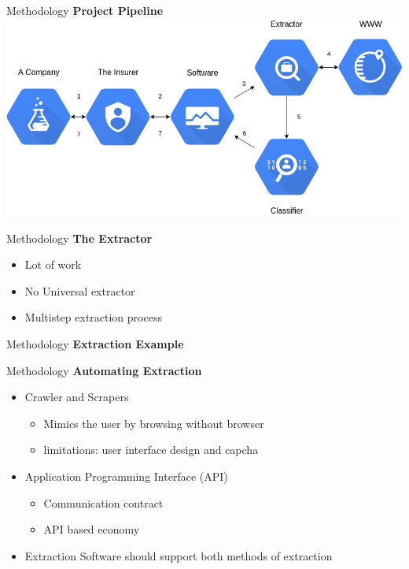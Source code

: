 \begin{frame}[label=metho]{Methodology}
	\textbf{Project Pipeline}
	\includegraphics[width=\textwidth]{images/project_pipeline.png}
\end{frame}


\begin{frame}[label=metho]{Methodology}
	\textbf{The Extractor}
	\begin{itemize}
		\item Lot of work
		\item No Universal extractor
		\item Multistep extraction process
	\end{itemize}
\end{frame}


\begin{frame}[label=metho]{Methodology}
	\textbf{Extraction Example}
	
\end{frame}



\begin{frame}[label=metho]{Methodology}
	\textbf{Automating Extraction}
	\begin{itemize}
		\item Crawler and Scrapers
		\begin{itemize}
			\item Mimics the user by browsing without browser
			\item limitations: user interface design and capcha
		\end{itemize}		
		\item Application Programming Interface (API)
		\begin{itemize}
			\item Communication contract
			\item API based economy
		\end{itemize}	
		\item Extraction Software should support both methods of extraction
	\end{itemize}	
	
\end{frame}



